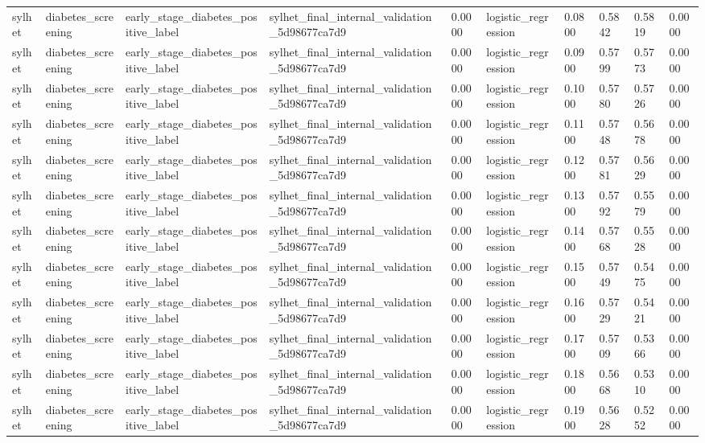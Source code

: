 \begin{tabular}{llllllllll}
sylhet & diabetes\_screening & early\_stage\_diabetes\_positive\_label & sylhet\_final\_internal\_validation\_5d98677ca7d9 & 0.0000 & logistic\_regression & 0.0800 & 0.5842 & 0.5819 & 0.0000 \\
sylhet & diabetes\_screening & early\_stage\_diabetes\_positive\_label & sylhet\_final\_internal\_validation\_5d98677ca7d9 & 0.0000 & logistic\_regression & 0.0900 & 0.5799 & 0.5773 & 0.0000 \\
sylhet & diabetes\_screening & early\_stage\_diabetes\_positive\_label & sylhet\_final\_internal\_validation\_5d98677ca7d9 & 0.0000 & logistic\_regression & 0.1000 & 0.5780 & 0.5726 & 0.0000 \\
sylhet & diabetes\_screening & early\_stage\_diabetes\_positive\_label & sylhet\_final\_internal\_validation\_5d98677ca7d9 & 0.0000 & logistic\_regression & 0.1100 & 0.5748 & 0.5678 & 0.0000 \\
sylhet & diabetes\_screening & early\_stage\_diabetes\_positive\_label & sylhet\_final\_internal\_validation\_5d98677ca7d9 & 0.0000 & logistic\_regression & 0.1200 & 0.5781 & 0.5629 & 0.0000 \\
sylhet & diabetes\_screening & early\_stage\_diabetes\_positive\_label & sylhet\_final\_internal\_validation\_5d98677ca7d9 & 0.0000 & logistic\_regression & 0.1300 & 0.5792 & 0.5579 & 0.0000 \\
sylhet & diabetes\_screening & early\_stage\_diabetes\_positive\_label & sylhet\_final\_internal\_validation\_5d98677ca7d9 & 0.0000 & logistic\_regression & 0.1400 & 0.5768 & 0.5528 & 0.0000 \\
sylhet & diabetes\_screening & early\_stage\_diabetes\_positive\_label & sylhet\_final\_internal\_validation\_5d98677ca7d9 & 0.0000 & logistic\_regression & 0.1500 & 0.5749 & 0.5475 & 0.0000 \\
sylhet & diabetes\_screening & early\_stage\_diabetes\_positive\_label & sylhet\_final\_internal\_validation\_5d98677ca7d9 & 0.0000 & logistic\_regression & 0.1600 & 0.5729 & 0.5421 & 0.0000 \\
sylhet & diabetes\_screening & early\_stage\_diabetes\_positive\_label & sylhet\_final\_internal\_validation\_5d98677ca7d9 & 0.0000 & logistic\_regression & 0.1700 & 0.5709 & 0.5366 & 0.0000 \\
sylhet & diabetes\_screening & early\_stage\_diabetes\_positive\_label & sylhet\_final\_internal\_validation\_5d98677ca7d9 & 0.0000 & logistic\_regression & 0.1800 & 0.5668 & 0.5310 & 0.0000 \\
sylhet & diabetes\_screening & early\_stage\_diabetes\_positive\_label & sylhet\_final\_internal\_validation\_5d98677ca7d9 & 0.0000 & logistic\_regression & 0.1900 & 0.5628 & 0.5252 & 0.0000 \\

\end{tabular}
